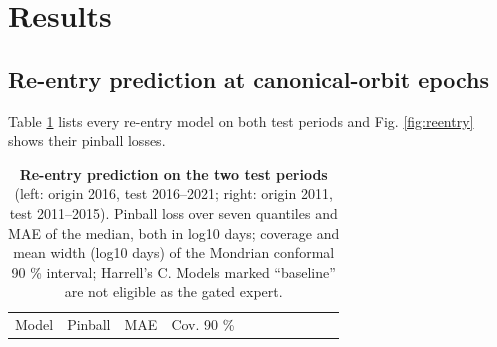 \documentclass[
]{article}
\begin{document}
\section{Results}\label{sec:results}

\subsection{Re-entry prediction at canonical-orbit
epochs}\label{sec:res-reentry}

Table \ref{tbl:reentry} lists every re-entry model on both test periods
and Fig. \ref{fig:reentry} shows their pinball losses.

\begin{longtable}[]{@{}
  >{\raggedright\arraybackslash}p{}
  >{\raggedright\arraybackslash}p{}
  >{\raggedright\arraybackslash}p{}
  >{\raggedright\arraybackslash}p{}
  >{\raggedright\arraybackslash}p{}
  >{\raggedright\arraybackslash}p{}
  >{\raggedright\arraybackslash}p{}
  >{\raggedright\arraybackslash}p{}
  >{\raggedright\arraybackslash}p{}
  >{\raggedright\arraybackslash}p{}
  >{\raggedright\arraybackslash}p{}@{}}
\caption{\textbf{Re-entry prediction on the two test periods} (left:
origin 2016, test 2016--2021; right: origin 2011, test 2011--2015).
Pinball loss over seven quantiles and MAE of the median, both in log10
days; coverage and mean width (log10 days) of the Mondrian conformal 90
\% interval; Harrell's C. Models marked ``baseline'' are not eligible as
the gated expert.}\label{tbl:reentry}\tabularnewline
\toprule\noalign{}
\begin{minipage}[b]{\linewidth}\raggedright
Model
\end{minipage} & \begin{minipage}[b]{\linewidth}\raggedright
Pinball
\end{minipage} & \begin{minipage}[b]{\linewidth}\raggedright
MAE
\end{minipage} & \begin{minipage}[b]{\linewidth}\raggedright
Cov. 90 \%
\end{minipage} & \begin{minipage}[b]{\linewidth}\raggedright

\end{minipage}
\end{longtable}
\end{document}
